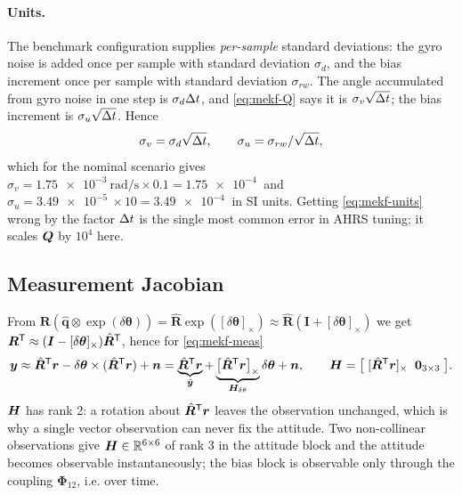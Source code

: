 \paragraph{Units.} The benchmark configuration supplies \emph{per-sample} standard deviations: the
gyro noise is added once per sample with standard deviation $\sigma_d$, and the bias increment once
per sample with standard deviation $\sigma_{rw}$. The angle accumulated from gyro noise in one step
is $\sigma_d\Delta t$, and \eqref{eq:mekf-Q} says it is $\sigma_v\sqrt{\Delta t}$; the bias increment is
$\sigma_u\sqrt{\Delta t}$. Hence
\begin{equation}
\sigma_v = \sigma_d\sqrt{\Delta t},\qquad \sigma_u = \sigma_{rw}/\sqrt{\Delta t} ,
\label{eq:mekf-units}
\end{equation}
which for the nominal scenario gives
$\sigma_v = \SI{1.75e-3}{\radian\per\second}\times0.1 = \SI{1.75e-4}{}$ and
$\sigma_u=\SI{3.49e-5}{}\times10=\SI{3.49e-4}{}$ in SI units. Getting
\eqref{eq:mekf-units} wrong by the factor $\Delta t$ is the single most common error in AHRS tuning; it
scales $\bm{Q}$ by $10^4$ here.

\subsection{Measurement Jacobian}
From $\bm{R}(\hat{\bm{q}}\otimes\exp(\delta\bm{\theta}))=\hat{\bm{R}}\exp([\delta\bm{\theta}]_\times)
\approx\hat{\bm{R}}(\bm{I}+[\delta\bm{\theta}]_\times)$ we get
$\bm{R}^{\mathsf{T}}\approx(\bm{I}-[\delta\bm{\theta}]_\times)\hat{\bm{R}}^{\mathsf{T}}$, hence for \eqref{eq:mekf-meas}
\begin{equation}
\bm{y} \approx \hat{\bm{R}}^{\mathsf{T}}\bm{r} - \delta\bm{\theta}\times(\hat{\bm{R}}^{\mathsf{T}}\bm{r}) + \bm{n}
 = \underbrace{\hat{\bm{R}}^{\mathsf{T}}\bm{r}}_{\hat{\bm{y}}}
  + \underbrace{\big[\hat{\bm{R}}^{\mathsf{T}}\bm{r}\big]_\times}_{\bm{H}_{\delta\theta}}\delta\bm{\theta} + \bm{n},
\qquad
\bm{H} = \big[\;[\hat{\bm{R}}^{\mathsf{T}}\bm{r}]_\times \;\;\bm{0}_{3\times3}\;\big] .
\label{eq:mekf-H}
\end{equation}
$\bm{H}$ has rank 2: a rotation about $\hat{\bm{R}}^{\mathsf{T}}\bm{r}$ leaves the observation unchanged, which
is why a single vector observation can never fix the attitude. Two non-collinear observations give
$\bm{H}\in\mathbb{R}^{6\times6}$ of rank 3 in the attitude block and the attitude becomes observable
instantaneously; the bias block is observable only through the coupling $\bm{\Phi}_{12}$, i.e. over
time.

